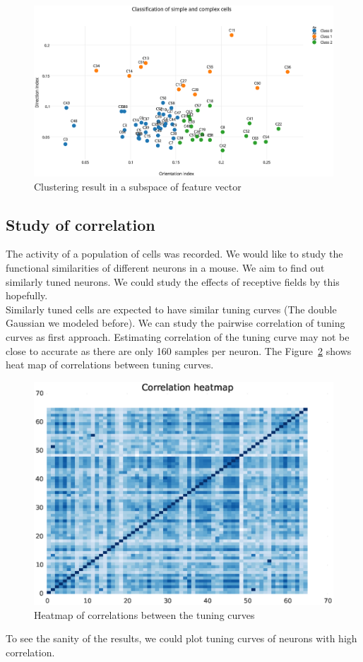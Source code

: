 \documentclass[11pt]{article}
\begin{document}
\begin{figure}[h]
    \centering
    \label{clusters}
    \includegraphics[width=.8\textwidth]{plots/clusters}
    \caption{Clustering result in a subspace of feature vector}
\end{figure}
\subsection{Study of correlation} %
\label{sub:study_of_correlation}
The activity of a population of cells was recorded. We would like to study the functional similarities of different neurons in a mouse. We aim to find out similarly tuned neurons. We could study the effects of receptive fields by this hopefully.\\
Similarly tuned cells are expected to have similar tuning curves (The double Gaussian we modeled before). We can study the pairwise correlation of tuning curves as first approach. Estimating correlation of the tuning curve may not be close to accurate as there are only 160 samples per neuron. The Figure~\ref{tuningCorr} shows heat map of correlations between tuning curves.
\begin{figure}[h]
    \centering
    \includegraphics[width=\textwidth]{plots/tuningCorr}
    \caption{Heatmap of correlations between the tuning curves}
    \label{tuningCorr}
\end{figure}
To see the sanity of the results, we could plot tuning curves of neurons with high correlation.

\newpage

% 

\end{document}
